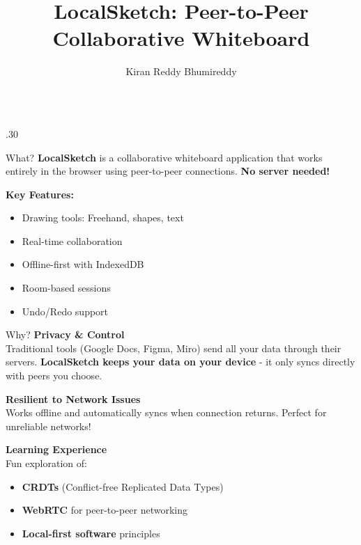\documentclass[final,t]{beamer}
\title{\LARGE LocalSketch: Peer-to-Peer Collaborative Whiteboard}
\author{Kiran Reddy Bhumireddy}
\begin{document}
\begin{frame}[t]
\begin{columns}[t]

\begin{column}{.30\linewidth}

\begin{block}{What?}
\textbf{LocalSketch} is a collaborative whiteboard application that works entirely in the browser using peer-to-peer connections. \textbf{No server needed!}

\vspace{0.5cm}
\textbf{Key Features:}
\begin{itemize}
    \item Drawing tools: Freehand, shapes, text
    \item Real-time collaboration
    \item Offline-first with IndexedDB
    \item Room-based sessions
    \item Undo/Redo support
\end{itemize}
\end{block}

\vspace{0.5cm}

\begin{block}{Why?}
\textbf{Privacy \& Control}\\
Traditional tools (Google Docs, Figma, Miro) send all your data through their servers. \textbf{LocalSketch keeps your data on your device} - it only syncs directly with peers you choose.

\vspace{0.5cm}
\textbf{Resilient to Network Issues}\\
Works offline and automatically syncs when connection returns. Perfect for unreliable networks!

\vspace{0.5cm}
\textbf{Learning Experience}\\
Fun exploration of:
\begin{itemize}
    \item \textbf{CRDTs} (Conflict-free Replicated Data Types)
    \item \textbf{WebRTC} for peer-to-peer networking
    \item \textbf{Local-first software} principles
\end{itemize}
\end{block}

\vspace{0.5cm}


\end{column}
\end{columns}
\end{frame}
\end{document}
